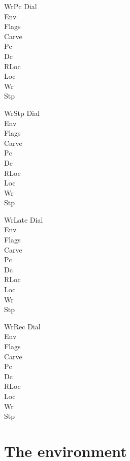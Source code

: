 \documentclass[a4paper,10pt,fleqn]{article}
\begin{document}
\begin{schema}{WrPc}
  \Xi Dial \\ \Xi Env \\ \Xi Flags \\ \Xi Carve \\ \Delta Pc \\ \Xi Dc \\
  \Xi RLoc \\ \Xi Loc \\ \Delta Wr \\ \Xi Stp
\end{schema}

\begin{schema}{WrStp}
  \Xi Dial \\ \Xi Env \\ \Xi Flags \\ \Xi Carve \\ \Delta Pc \\ \Xi Dc \\
  \Xi RLoc \\ \Xi Loc \\ \Delta Wr \\ \Delta Stp
\end{schema}

\begin{schema}{WrLate}
  \Xi Dial \\ \Xi Env \\ \Xi Flags \\ \Delta Carve \\ \Delta Pc \\ \Xi Dc \\
  \Xi RLoc \\ \Xi Loc \\ \Delta Wr \\ \Xi Stp
\end{schema}

\begin{schema}{WrRec}
  \Delta Dial \\ \Xi Env \\ \Delta Flags \\ \Xi Carve \\ \Delta Pc \\ \Xi Dc \\
  \Xi RLoc \\ \Xi Loc \\ \Xi Wr \\ \Xi Stp
\end{schema}

\section{The environment}
\end{document}
